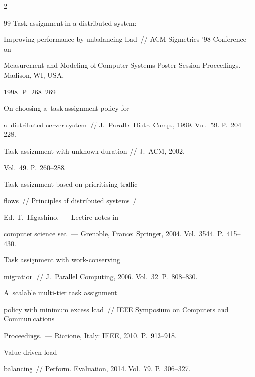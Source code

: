 \begin{multicols}{2}
{{\begin{thebibliography}{99}
     Task assignment in a distributed system: 


Improving performance by unbalancing load~// ACM Sigmetrics '98 Conference on 


Measurement and Modeling of Computer Systems Poster Session Proceedings.~--- Madison, WI, USA, 


1998. P.~268--269.




     On choosing a~task assignment policy for 


a~distributed server system~// J.~Parallel Distr. Comp., 1999. Vol.~59. P.~204--228.




     Task assignment with unknown duration~// J.~ACM, 2002. 


Vol.~49. P.~260--288.




     Task assignment based on prioritising traffic 


flows~// Principles of distributed systems~/


Ed. T.~Higashino.~--- Lectire notes in


computer science ser.~--- Grenoble, France:  Springer, 2004. Vol.~3544. P.~415--430.




     Task assignment with work-conserving 


migration~// J.~Parallel Computing, 2006. Vol.~32. P.~808--830.




     A~scalable multi-tier task assignment 


policy with minimum excess load~//  IEEE Symposium on Computers and Communications 


Proceedings.~--- Riccione, Italy: IEEE, 2010. P.~913--918.




     Value driven load 


balancing~// Perform. Evaluation, 2014. Vol.~79. P.~306--327.





\end{thebibliography}}}
\end{multicols}
